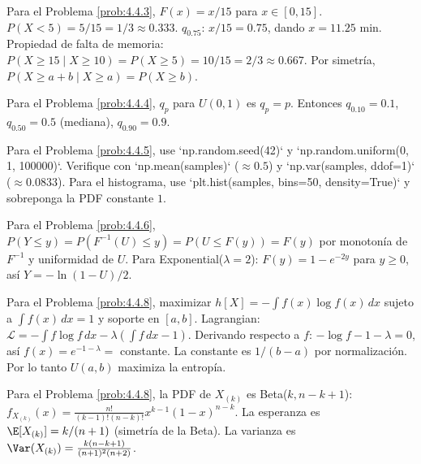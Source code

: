 \begin{sugerencia}
	\label{sug:4.4.3}
	Para el Problema \ref{prob:4.4.3}, $F(x) = x/15$ para $x \in [0, 15]$. $P(X < 5) = 5/15 = 1/3 \approx 0.333$. $q_{0.75}$: $x/15 = 0.75$, dando $x = 11.25$ min. Propiedad de falta de memoria: $P(X \ge 15 \mid X \ge 10) = P(X \ge 5) = 10/15 = 2/3 \approx 0.667$. Por simetría, $P(X \ge a + b \mid X \ge a) = P(X \ge b)$.
\end{sugerencia}

\begin{sugerencia}
	\label{sug:4.4.4}
	Para el Problema \ref{prob:4.4.4}, $q_{p}$ para $U(0, 1)$ es $q_{p} = p$. Entonces $q_{0.10} = 0.1$, $q_{0.50} = 0.5$ (mediana), $q_{0.90} = 0.9$.
\end{sugerencia}

\begin{sugerencia}
	\label{sug:4.4.5}
	Para el Problema \ref{prob:4.4.5}, use `np.random.seed(42)` y `np.random.uniform(0, 1, 100000)`. Verifique con `np.mean(samples)` ($\approx 0.5$) y `np.var(samples, ddof=1)` ($\approx 0.0833$). Para el histograma, use `plt.hist(samples, bins=50, density=True)` y sobreponga la PDF constante $1$.
\end{sugerencia}

\begin{sugerencia}
	\label{sug:4.4.6}
	Para el Problema \ref{prob:4.4.6}, $P(Y \le y) = P(F^{-1}(U) \le y) = P(U \le F(y)) = F(y)$ por monotonía de $F^{-1}$ y uniformidad de $U$. Para Exponential($\lambda = 2$): $F(y) = 1 - e^{-2y}$ para $y \ge 0$, así $Y = -\ln(1-U)/2$.
\end{sugerencia}

\begin{sugerencia}
	\label{sug:4.4.7}
	Para el Problema \ref{prob:4.4.8}, maximizar $h[X] = -\int f(x) \log f(x)\,dx$ sujeto a $\int f(x)\,dx = 1$ y soporte en $[a, b]$. Lagrangian: $\mathcal{L} = -\int f \log f\,dx - \lambda(\int f\,dx - 1)$. Derivando respecto a $f$: $-\log f - 1 - \lambda = 0$, así $f(x) = e^{-1-\lambda} = $ constante. La constante es $1/(b-a)$ por normalización. Por lo tanto $U(a,b)$ maximiza la entropía.
\end{sugerencia}

\begin{sugerencia}
	\label{sug:4.4.8}
	Para el Problema \ref{prob:4.4.8}, la PDF de $X_{(k)}$ es Beta($k, n-k+1$): $f_{X_{(k)}}(x) = \frac{n!}{(k-1)!(n-k)!} x^{k-1}(1-x)^{n-k}$. La esperanza es $\E[X_{(k)}] = k/(n+1)$ (simetría de la Beta). La varianza es $\Var(X_{(k)}) = \frac{k(n-k+1)}{(n+1)^{2}(n+2)}$.
\end{sugerencia}

